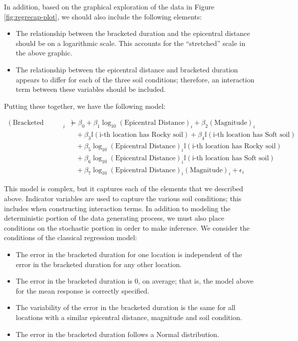 \documentclass[
]{book}
\providecommand{\tightlist}{%
  \setlength{\itemsep}{0pt}\setlength{\parskip}{0pt}}
\theoremstyle{plain}
\theoremstyle{mydefn}
\theoremstyle{myexmpl}
\theoremstyle{remark}
\begin{document}
In addition, based on the graphical exploration of the data in Figure \ref{fig:regrecap-plot}, we should also include the following elements:

\begin{itemize}
\tightlist
\item
  The relationship between the bracketed duration and the epicentral distance should be on a logarithmic scale. This accounts for the ``stretched'' scale in the above graphic.
\item
  The relationship between the epicentral distance and bracketed duration appears to differ for each of the three soil conditions; therefore, an interaction term between these variables should be included.
\end{itemize}

Putting these together, we have the following model:

\begin{equation}
  \begin{aligned}
    (\text{Bracketed Duration})_i &= \beta_0 + \beta_1\log_{10}(\text{Epicentral Distance})_i + \beta_2(\text{Magnitude})_i \\
      &\quad + \beta_3\mathbb{I}(\text{i-th location has Rocky soil}) + \beta_4\mathbb{I}(\text{i-th location has Soft soil}) \\
      &\quad + \beta_5\log_{10}(\text{Epicentral Distance})_i\mathbb{I}(\text{i-th location has Rocky soil}) \\
      &\quad + \beta_6\log_{10}(\text{Epicentral Distance})_i\mathbb{I}(\text{i-th location has Soft soil}) \\
      &\quad + \beta_7\log_{10}(\text{Epicentral Distance})_i(\text{Magnitude})_i + \epsilon_i
  \end{aligned}
  \label{eq:regrecap-model}
\end{equation}

This model is complex, but it captures each of the elements that we described above. Indicator variables are used to capture the various soil conditions; this includes when constructing interaction terms. In addition to modeling the deterministic portion of the data generating process, we must also place conditions on the stochastic portion in order to make inference. We consider the conditions of the classical regression model:

\begin{itemize}
\tightlist
\item
  The error in the bracketed duration for one location is independent of the error in the bracketed duration for any other location.
\item
  The error in the bracketed duration is 0, on average; that is, the model above for the mean response is correctly specified.
\item
  The variability of the error in the bracketed duration is the same for all locations with a similar epicentral distance, magnitude and soil condition.
\item
  The error in the bracketed duration follows a Normal distribution.
\end{itemize}
\end{document}
